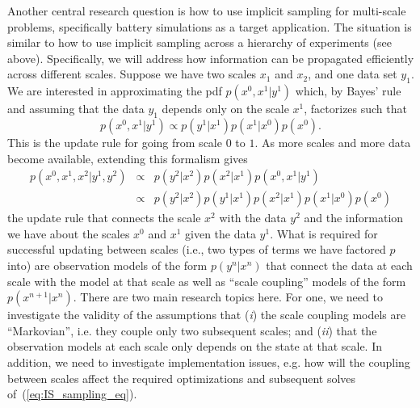 \documentclass[11pt]{article}
\newcommand{\MarginPar}[1]{\marginpar{%
\vskip-\baselineskip %
\raggedright\tiny\sffamily
\hrule\smallskip{\color{red}#1}\par\smallskip\hrule}}
\begin{document}
Another central research question is how to use implicit sampling for multi-scale problems, specifically battery simulations as a target application. The situation is similar to how to use implicit sampling across a hierarchy of experiments (see above). Specifically, we will address how information can be propagated efficiently across different scales. Suppose we have two scales $x_1$ and $x_2$, and one data set $y_1$. We are interested in approximating the pdf $p(x^0, x^1|y^1)$ which, by Bayes' rule and assuming that the data $y_1$ depends only on the scale $x^1$, factorizes such that
\begin{equation}
	p(x^0, x^1|y^1) \propto p(y^1|x^1) p(x^1|x^0) p(x^0).
\end{equation}
This is the update rule for going from scale $0$ to $1$. As more scales and more data become available, extending this formalism gives
\begin{eqnarray}
	p(x^0,x^1,x^2 | y^1,y^2) & \propto  & p(y^2 | x^2) p(x^2|x^1) p(x^0,x^1 | y^1) \\
	  & \propto & p(y^2 | x^2)  p(y^1|x^1)    p(x^2|x^1)p(x^1|x^0) p(x^0)
\end{eqnarray}
the update rule that connects the scale $x^2$ with the data $y^2$ and the information we have about the scales $x^0$ and $x^1$ given the data $y^1$. What is required for successful updating between scales 
(i.e., two types of terms we have factored $p$ into) are observation models
of the form $p(y^{n}|x^{n})$ that connect the data at each scale with the model at that scale as well as ``scale coupling'' models of the form $p(x^{n+1}|x^n)$. There are two main research topics here. For one, we need to investigate the validity of the assumptions that (\emph{i}) the scale coupling models are ``Markovian'', i.e. they couple only two subsequent scales; and (\emph{ii}) that the observation models at each scale only depends on the state at that scale. In addition, we need to investigate implementation issues, e.g. how will the coupling between scales affect the required optimizations and subsequent solves of~(\ref{eq:IS_sampling_eq}). \MarginPar{Peter: can you check that this makes sense?}
\end{document}
